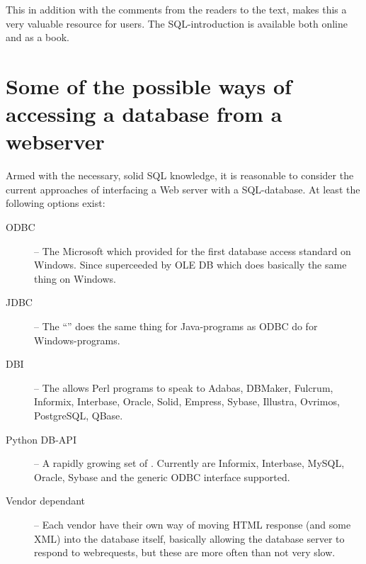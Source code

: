 
This in addition with the comments from the readers to the text, makes
this a very valuable resource for users.  The SQL-introduction is
available both online and as a book.


\section{Some of the possible ways of accessing a database from a webserver}
\label{sec:accessing-a-database-from-a-webserver}

Armed with the necessary, solid SQL knowledge, it is reasonable to
consider the current approaches of interfacing a Web server with a
SQL-database.  At least the following options exist:

\begin{description}
\item[ODBC] -- The Microsoft  which
  provided for the first database access standard on Windows.  Since
  superceeded by OLE DB which does basically the same thing on Windows.
\item[JDBC] -- The ``'' does the same thing for Java-programs as ODBC do for
  Windows-programs.
\item[DBI] -- The 
  allows Perl programs to speak to Adabas, DBMaker, Fulcrum, Informix,
  Interbase, Oracle, Solid, Empress, Sybase, Illustra, Ovrimos,
  PostgreSQL, QBase.
\item[Python DB-API] -- A rapidly growing set of
  .  Currently are Informix, Interbase,
  MySQL, Oracle, Sybase and the generic ODBC interface supported.
\item[Vendor dependant] -- Each vendor have their own way of moving
  HTML response (and some XML) into the database itself, basically
  allowing the database server to respond to webrequests, but these are
  more often than not very slow.

  
\end{description}




